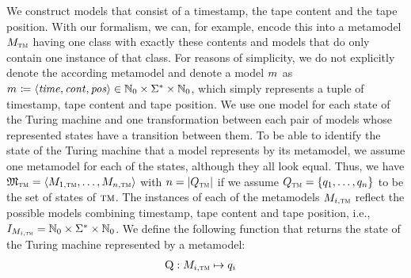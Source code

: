We construct models that consist of a timestamp, the tape content and the tape position.
With our formalism, we can, for example, encode this into a metamodel $\metamodel{M}{\TuringMachine}$ having one class with exactly these contents and models that do only contain one instance of that class.
For reasons of simplicity, we do not explicitly denote the according metamodel and denote a model $\model{m}{}$ as $\model{m}{} \equalsperdefinition \tupled{\mathvariable{time}, \mathvariable{cont}, \mathvariable{pos}} \in \mathbb{N}_0 \times \Sigma^* \times \mathbb{N}_0$, which simply represents a tuple of timestamp, tape content and tape position.
We use one model for each state of the Turing machine and one transformation between each pair of models whose represented states have a transition between them.
To be able to identify the state of the Turing machine that a model represents by its metamodel, we assume one metamodel for each of the states, although they all look equal. Thus, we have $\metamodeltuple{M}_\TuringMachine = \tupled{\metamodel{M}{1, \TuringMachine}, \dots, \metamodel{M}{n, \TuringMachine}}$ with $n = \lvert Q_{\textsc{tm}}\rvert$ if we assume $Q_{\textsc{tm}} = \{ q_1, \dots, q_n \}$ to be the set of states of $\textsc{tm}$.
The instances of each of the metamodels $\metamodel{M}{i,\TuringMachine}$ reflect the possible models combining timestamp, tape content and tape position, i.e., $\metamodelinstanceset{M}{i, \TuringMachine} =  \mathbb{N}_0 \times \Sigma^* \times \mathbb{N}_0$.
We define the following function that returns the state of the Turing machine represented by a metamodel:
\begin{align*}
     \function{Q} : %
     \metamodel{M}{i,\TuringMachine} & \mapsto q_i %
\end{align*}

